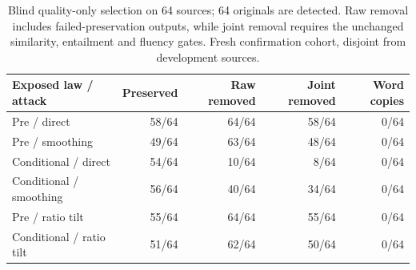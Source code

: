 \begin{table}[ht]\centering\small
\begin{tabular}{lrrrr}\toprule
Exposed law / attack & Preserved & Raw removed & Joint removed & Word copies\\\midrule
Pre / direct & 58/64 & 64/64 & 58/64 & 0/64\\
Pre / smoothing & 49/64 & 63/64 & 48/64 & 0/64\\
Conditional / direct & 54/64 & 10/64 & 8/64 & 0/64\\
Conditional / smoothing & 56/64 & 40/64 & 34/64 & 0/64\\
Pre / ratio tilt & 55/64 & 64/64 & 55/64 & 0/64\\
Conditional / ratio tilt & 51/64 & 62/64 & 50/64 & 0/64\\
\bottomrule\end{tabular}
\caption{Blind quality-only selection on 64 sources; 64 originals are detected. Raw removal includes failed-preservation outputs, while joint removal requires the unchanged similarity, entailment and fluency gates. Fresh confirmation cohort, disjoint from development sources.}\end{table}
